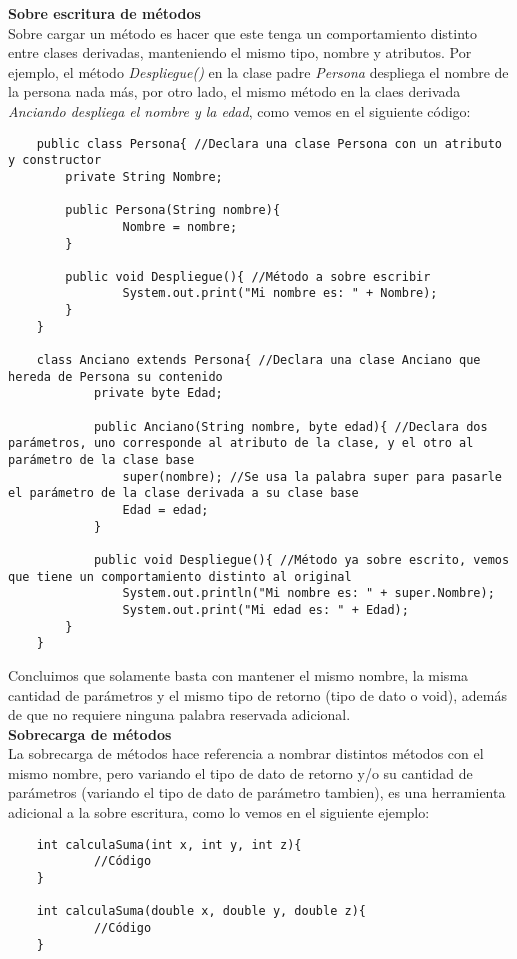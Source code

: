 \textbf{Sobre escritura de métodos}\\
Sobre cargar un método es hacer que este tenga un comportamiento distinto entre clases derivadas, manteniendo el mismo tipo, nombre y atributos. Por ejemplo, el método \textit{Despliegue()} en la clase padre \textit{Persona} despliega el nombre de la persona nada más, por otro lado, el mismo método en la claes derivada \textit{Anciando despliega el nombre y la edad}, como vemos en el siguiente código:
\begin{lstlisting}
    public class Persona{ //Declara una clase Persona con un atributo y constructor
        private String Nombre;
        
        public Persona(String nombre){
        		Nombre = nombre;
        }
        
        public void Despliegue(){ //Método a sobre escribir
        		System.out.print("Mi nombre es: " + Nombre);
        }
    }
    
    class Anciano extends Persona{ //Declara una clase Anciano que hereda de Persona su contenido
    		private byte Edad;
    		
    		public Anciano(String nombre, byte edad){ //Declara dos parámetros, uno corresponde al atributo de la clase, y el otro al parámetro de la clase base
    			super(nombre); //Se usa la palabra super para pasarle el parámetro de la clase derivada a su clase base
    			Edad = edad;
    		}
    		
    		public void Despliegue(){ //Método ya sobre escrito, vemos que tiene un comportamiento distinto al original
        		System.out.println("Mi nombre es: " + super.Nombre);
        		System.out.print("Mi edad es: " + Edad);
        }
    }
\end{lstlisting}
Concluimos que solamente basta con mantener el mismo nombre, la misma cantidad de parámetros y el mismo tipo de retorno (tipo de dato o void), además de que no requiere ninguna palabra reservada adicional.\\
\textbf{Sobrecarga de métodos}\\
La sobrecarga de métodos hace referencia a nombrar distintos métodos con el mismo nombre, pero variando el tipo de dato de retorno y/o su cantidad de parámetros (variando el tipo de dato de parámetro tambien), es una herramienta adicional a la sobre escritura, como lo vemos en el siguiente ejemplo:
\begin{lstlisting}
	int calculaSuma(int x, int y, int z){
    		//Código
	}

	int calculaSuma(double x, double y, double z){
    		//Código
	}
\end{lstlisting}

